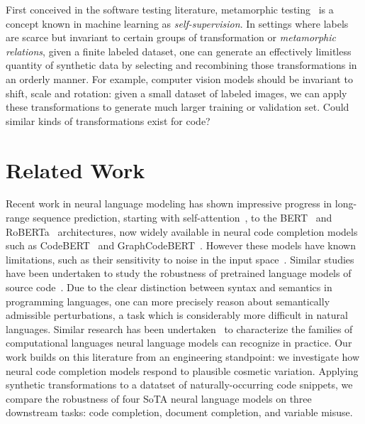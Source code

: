 \documentclass[usenames,dvipsnames]{article} %
\begin{document}
First conceived in the software testing literature, metamorphic testing~\cite{chen1995metamorphic} is a concept known in machine learning as \textit{self-supervision}. In settings where labels are scarce but invariant to certain groups of transformation or \textit{metamorphic relations}, given a finite labeled dataset, one can generate an effectively limitless quantity of synthetic data by selecting and recombining those transformations in an orderly manner. For example, computer vision models should be invariant to shift, scale and rotation: given a small dataset of labeled images, we can apply these transformations to generate much larger training or validation set. Could similar kinds of transformations exist for code?

  \section{Related Work}\label{sec:related_work}

 Recent work in neural language modeling has shown impressive progress in long-range sequence prediction, starting with self-attention~\citep{vaswani2017attention}, to the BERT~\citep{devlin2018bert} and RoBERTa~\citep{liu2019roberta} architectures, now widely available in neural code completion models such as CodeBERT~\citep{feng2020codebert} and GraphCodeBERT~\citep{guo2021graphcodebert}. However these models have known limitations, such as their sensitivity to noise in the input space~\cite{sun2020adv}. Similar studies have been undertaken to study the robustness of pretrained language models of source code~\citep{bielik2020adversarial, zhou2021adversarial}. Due to the clear distinction between syntax and semantics in programming languages, one can more precisely reason about semantically admissible perturbations, a task which is considerably more difficult in natural languages. Similar research has been undertaken~\citep{weiss2018practical, chirkova2020empirical, chen2021evaluating} to characterize the families of computational languages neural language models can recognize in practice. Our work builds on this literature from an engineering standpoint: we investigate how neural code completion models respond to plausible cosmetic variation. Applying synthetic transformations to a datatset of naturally-occurring code snippets, we compare the robustness of four SoTA neural language models on three downstream tasks: code completion, document completion, and variable misuse. %
\end{document}
